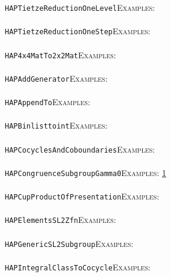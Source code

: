 \documentclass[a4paper,11pt]{report}
\begin{document}
{{ \texttt{HAPTietzeReduction{\textunderscore}OneLevel}{\nobreakspace}{\nobreakspace}{\nobreakspace}{\nobreakspace}\textsc{Examples:} \\
 \\
 \texttt{HAPTietzeReduction{\textunderscore}OneStep}{\nobreakspace}{\nobreakspace}{\nobreakspace}{\nobreakspace}\textsc{Examples:} \\
 \\
 \texttt{HAP{\textunderscore}4x4MatTo2x2Mat}{\nobreakspace}{\nobreakspace}{\nobreakspace}{\nobreakspace}\textsc{Examples:} \\
 \\
 \texttt{HAP{\textunderscore}AddGenerator}{\nobreakspace}{\nobreakspace}{\nobreakspace}{\nobreakspace}\textsc{Examples:} \\
 \\
 \texttt{HAP{\textunderscore}AppendTo}{\nobreakspace}{\nobreakspace}{\nobreakspace}{\nobreakspace}\textsc{Examples:} \\
 \\
 \texttt{HAP{\textunderscore}Binlisttoint}{\nobreakspace}{\nobreakspace}{\nobreakspace}{\nobreakspace}\textsc{Examples:} \\
 \\
 \texttt{HAP{\textunderscore}CocyclesAndCoboundaries}{\nobreakspace}{\nobreakspace}{\nobreakspace}{\nobreakspace}\textsc{Examples:} \\
 \\
 \texttt{HAP{\textunderscore}CongruenceSubgroupGamma0}{\nobreakspace}{\nobreakspace}{\nobreakspace}{\nobreakspace}\textsc{Examples:} \href{tutorial/chap10.html} {1}{\nobreakspace} \\
 \\
 \texttt{HAP{\textunderscore}CupProductOfPresentation}{\nobreakspace}{\nobreakspace}{\nobreakspace}{\nobreakspace}\textsc{Examples:} \\
 \\
 \texttt{HAP{\textunderscore}ElementsSL2Zfn}{\nobreakspace}{\nobreakspace}{\nobreakspace}{\nobreakspace}\textsc{Examples:} \\
 \\
 \texttt{HAP{\textunderscore}GenericSL2Subgroup}{\nobreakspace}{\nobreakspace}{\nobreakspace}{\nobreakspace}\textsc{Examples:} \\
 \\
 \texttt{HAP{\textunderscore}IntegralClassToCocycle}{\nobreakspace}{\nobreakspace}{\nobreakspace}{\nobreakspace}\textsc{Examples:} \\
 \\
}}
\end{document}
